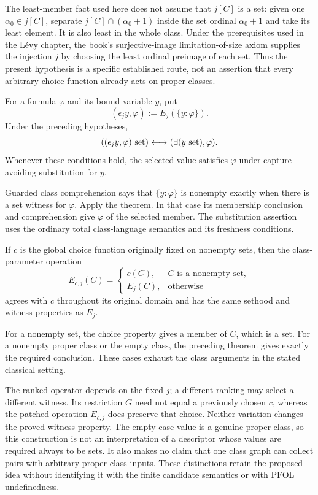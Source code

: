 The least-member fact used here does not assume that $j[C]$ is a set:
given one $\alpha_0\in j[C]$, separate
$j[C]\cap(\alpha_0+1)$ inside the set ordinal $\alpha_0+1$ and take
its least element. It is also least in the whole class. Under the
prerequisites used in the L\'evy chapter, the book's surjective-image
limitation-of-size axiom supplies the injection $j$ by choosing the
least ordinal preimage of each set. Thus the present hypothesis is a
specific established route, not an assertion that every arbitrary
choice function already acts on proper classes.

\begin{corollary}
For a formula $\varphi$ and its bound variable $y$, put
\[
(\epsilon_j y,\varphi):=E_j(\{y:\varphi\}).
\]
Under the preceding hypotheses,
\[
((\epsilon_j y,\varphi)\mathrm{\ set})
{\ \longleftrightarrow\ } (\exists(y\mathrm{\ set}),\varphi).
\]
Whenever these conditions hold, the selected value satisfies
$\varphi$ under capture-avoiding substitution for $y$.
\end{corollary}
\Proof
Guarded class comprehension says that $\{y:\varphi\}$ is nonempty
exactly when there is a set witness for $\varphi$. Apply the theorem.
In that case its membership conclusion and comprehension give
$\varphi$ of the selected member. The substitution assertion uses the
ordinary total class-language semantics and its freshness conditions.
\Done

\begin{corollary}
If $c$ is the global choice function originally fixed on nonempty sets,
then the class-parameter operation
\[
E_{c,j}(C)=
\begin{cases}
c(C),&C\text{ is a nonempty set},\\
E_j(C),&\text{otherwise}
\end{cases}
\]
agrees with $c$ throughout its original domain and has the same
sethood and witness properties as $E_j$.
\end{corollary}
\Proof
For a nonempty set, the choice property gives a member of $C$, which
is a set. For a nonempty proper class or the empty class, the preceding
theorem gives exactly the required conclusion. These cases exhaust
the class arguments in the stated classical setting.
\Done

The ranked operator depends on the fixed $j$; a different ranking may
select a different witness. Its restriction $G$ need not equal a
previously chosen $c$, whereas the patched operation $E_{c,j}$ does
preserve that choice. Neither variation changes the proved witness
property. The empty-case value is a genuine proper
class, so this construction is not an interpretation of a descriptor
whose values are required always to be sets. It also makes no claim
that one class graph can collect pairs with arbitrary proper-class
inputs. These distinctions retain the proposed idea without identifying
it with the finite candidate semantics or with PFOL undefinedness.

